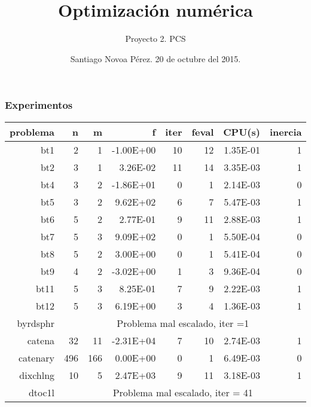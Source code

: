 \documentclass[12pt]{article}
\begin{document}
\title{Optimizaci\'on num\'erica}
\author{Proyecto 2. PCS}
\date{ Santiago Novoa P\'erez. 20 de octubre del 2015.}
\maketitle





 
\subsubsection*{Experimentos} 
\begin{center}
\begin{longtable}[htbp]{rrrrrrrr}
    \toprule
    problema  &  n     &  m     &  f     &  iter  &    feval &  CPU(s) &  inercia \\
    \midrule
    bt1   & 2     & 1     & -1.00E+00 & 10    & 12    & 1.35E-01 & 1 \\
    bt2   & 3     & 1     & 3.26E-02 & 11    & 14    & 3.35E-03 & 1 \\
    bt4   & 3     & 2     & -1.86E+01 & 0     & 1     & 2.14E-03 & 0 \\
    bt5   & 3     & 2     & 9.62E+02 & 6     & 7     & 5.47E-03 & 1 \\
    bt6   & 5     & 2     & 2.77E-01 & 9     & 11    & 2.88E-03 & 1 \\
    bt7   & 5     & 3     & 9.09E+02 & 0     & 1     & 5.50E-04 & 0 \\
    bt8   & 5     & 2     & 3.00E+00 & 0     & 1     & 5.41E-04 & 0 \\
    bt9   & 4     & 2     & -3.02E+00 & 1     & 3     & 9.36E-04 & 0 \\
    bt11  & 5     & 3     & 8.25E-01 & 7     & 9     & 2.22E-03 & 1 \\
    bt12  & 5     & 3     & 6.19E+00 & 3     & 4     & 1.36E-03 & 1 \\
    byrdsphr & \multicolumn{7}{c}{Problema mal escalado, iter =1} \\
    catena & 32    & 11    & -2.31E+04 & 7     & 10    & 2.74E-03 & 1 \\
    catenary & 496   & 166   & 0.00E+00 & 0     & 1     & 6.49E-03 & 0 \\
    dixchlng & 10    & 5     & 2.47E+03 & 9     & 11    & 3.18E-03 & 1 \\
    dtoc1l & \multicolumn{7}{c}{Problema mal escalado, iter = 41} \\

\end{longtable}
\end{center}
\end{document}
